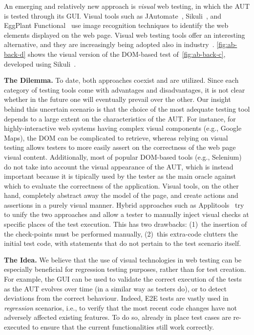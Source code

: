 An emerging and relatively new approach is \textit{visual} web testing, in which the AUT is tested through its GUI. 
Visual tools such as JAutomate~\cite{Alegroth2013jat}, Sikuli~\cite{Sikuli}, and EggPlant Functional~\cite{eggplant} use image recognition techniques to identify the web elements displayed on the web page. Visual web testing tools offer an interesting alternative, and they are increasingly being adopted also in industry~\cite{Alegroth2013jat}. 
\autoref{fig:ab-back-d} shows the visual version of the DOM-based test of~\autoref{fig:ab-back-c}, developed using Sikuli~\cite{Sikuli}. 

\noindent
\textbf{The Dilemma.}
To date, both approaches coexist and are utilized. Since each category of testing tools come with advantages and disadvantages, it is not clear whether in the future one will eventually prevail over the other. Our insight behind this uncertain scenario is that the choice of the most adequate testing tool depends to a large extent on the characteristics of the AUT. For instance, for highly-interactive web systems having complex visual components (e.g., Google Maps), the DOM can be complicated to retrieve, whereas relying on visual testing allows testers to more easily assert on the correctness of the web page visual content.
Additionally, most of popular DOM-based tools (e.g., Selenium) do not take into account the visual appearance of the AUT, which is instead important because it is tipically used by the tester as the main oracle against which to evaluate the correctness of the application. Visual tools, on the other hand, completely abstract away the model of the page, and create actions and assertions in a purely visual manner. 
%
Hybrid approaches such as Applitools~\cite{applitools} try to unify the two approaches and allow a tester to manually inject visual checks at specific places of the test execution. This has two drawbacks: (1)~the insertion of the check-points must be performed manually, (2)~this extra-code clutters the initial test code, with statements that do not pertain to the test scenario itself.

\noindent
\textbf{The Idea.}
We believe that the use of visual technologies in web testing can  be especially beneficial for regression testing purposes, rather than for test creation. For example, the GUI can be used to validate the correct execution of the tests as the AUT evolves over time (in a similar way as testers do), or to detect deviations from the correct behaviour.
Indeed, E2E tests are vastly used in \textit{regression} scenarios, i.e., to verify that the most recent code changes have not adversely affected existing features. To do so, already in place test cases are re-executed to ensure that the current functionalities still work correctly. 
%

